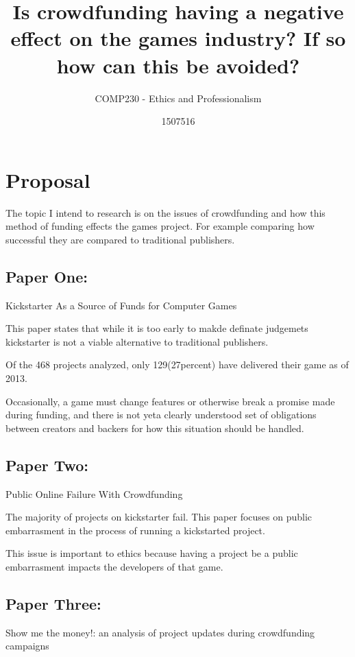 \documentclass{scrartcl}
\title{Is crowdfunding having a negative effect on the games industry? If so how can this be avoided? }
\subtitle{COMP230 - Ethics and Professionalism}
\author{1507516}
\begin{document}
\maketitle

\section{Proposal}

The topic I intend to research is on the issues of crowdfunding and how this method of funding effects the games project. For example comparing how successful they are compared to traditional publishers. 

\subsection{Paper One:}

Kickstarter As a Source of Funds for Computer Games
\cite{Harris:2013}

This paper states that while it is too early to makde definate judgemets kickstarter is not a viable alternative to traditional publishers.

Of the 468 projects analyzed, only 129(27percent) have delivered their game as of 2013.

Occasionally, a game must change features or otherwise break a promise made during funding, 
and there is not yeta clearly understood set of obligations between creators and backers for how this situation should be handled.



\subsection{Paper Two:}

Public Online Failure With Crowdfunding
\cite{Greenberg}

The majority of projects on kickstarter fail. This paper focuses on public embarrasment in the process of running a kickstarted project.

This issue is important to ethics because having a project be a public embarrasment impacts the developers of that game.




\subsection{Paper Three:}

Show me the money!: an analysis of project updates during crowdfunding campaigns
\cite{xu2014show}
\end{document}
